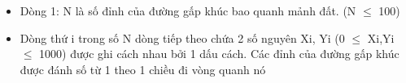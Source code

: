 \begin{itemize}
	\item Dòng 1: N là số đỉnh của đường gấp khúc bao quanh mảnh đất. (N $\le$ 100)
	\item Dòng thứ i trong số N dòng tiếp theo chứa 2 số nguyên Xi, Yi (0 $\le$ Xi,Yi $\le$ 1000) được ghi cách nhau bởi 1 dấu cách. Các đỉnh của đường gấp khúc được đánh số từ 1 theo 1 chiều đi vòng quanh nó
\end{itemize}